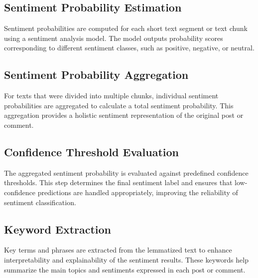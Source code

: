 \subsection{Sentiment Probability Estimation}

Sentiment probabilities are computed for each short text segment or text chunk using a sentiment analysis model. The model outputs probability scores corresponding to different sentiment classes, such as positive, negative, or neutral.

\subsection{Sentiment Probability Aggregation}

For texts that were divided into multiple chunks, individual sentiment probabilities are aggregated to calculate a total sentiment probability. This aggregation provides a holistic sentiment representation of the original post or comment.

\subsection{Confidence Threshold Evaluation}

The aggregated sentiment probability is evaluated against predefined confidence thresholds. This step determines the final sentiment label and ensures that low-confidence predictions are handled appropriately, improving the reliability of sentiment classification.

\subsection{Keyword Extraction}

Key terms and phrases are extracted from the lemmatized text to enhance interpretability and explainability of the sentiment results. These keywords help summarize the main topics and sentiments expressed in each post or comment.

